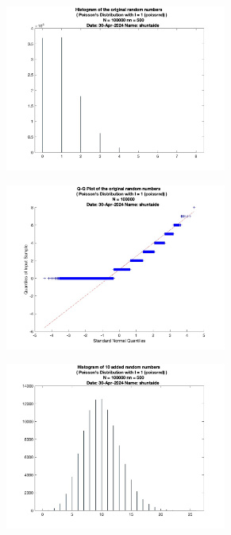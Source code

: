 \begin{figure}
	\centering
	\begin{subfigure}{0.48\linewidth}
		\centering
		\includegraphics[width=0.8\textwidth]{src/figures/cl-poisson/cl_original_poissrnd_hist_N=100000_nn=500.jpg}
		\label{fig:cl-poisson-original}
	\end{subfigure}
	\begin{subfigure}{0.48\linewidth}
		\centering
		\includegraphics[width=0.8\textwidth]{src/figures/cl-poisson/cl_original_poissrnd_qqpl_N=100000.jpg}
		\label{fig:cl-poisson-original-qqpl}
	\end{subfigure}
	\begin{subfigure}{0.48\linewidth}
		\centering
		\includegraphics[width=0.8\textwidth]{src/figures/cl-poisson/cl_added_poissrnd_hist_N=100000_nn=500.jpg}

\end{subfigure}
\end{figure}

